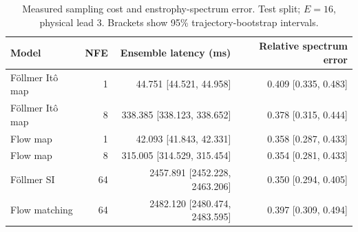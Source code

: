 \begin{table}[t]
\centering
\small
\setlength{\tabcolsep}{3pt}
\caption{Measured sampling cost and enstrophy-spectrum error. Test split; $E=16$, physical lead 3. Brackets show 95\% trajectory-bootstrap intervals.}
\label{tab:map-cost}
\begin{tabular}{lrrr}
\toprule
Model & NFE & Ensemble latency (ms) & Relative spectrum error \\
\midrule
Föllmer Itô map & 1 & 44.751 [44.521, 44.958] & 0.409 [0.335, 0.483] \\
Föllmer Itô map & 8 & 338.385 [338.123, 338.652] & 0.378 [0.315, 0.444] \\
\addlinespace
Flow map & 1 & 42.093 [41.843, 42.331] & 0.358 [0.287, 0.433] \\
Flow map & 8 & 315.005 [314.529, 315.454] & 0.354 [0.281, 0.433] \\
\addlinespace
Föllmer SI & 64 & 2457.891 [2452.228, 2463.206] & 0.350 [0.294, 0.405] \\
\addlinespace
Flow matching & 64 & 2482.120 [2480.474, 2483.595] & 0.397 [0.309, 0.494] \\
\bottomrule
\end{tabular}
\end{table}
